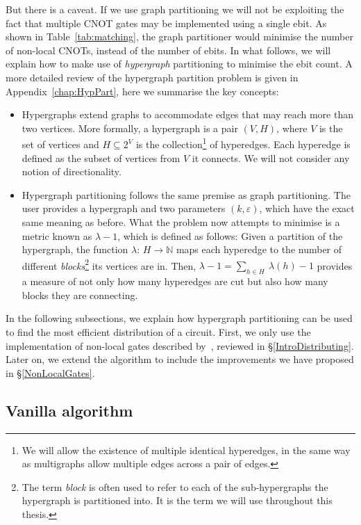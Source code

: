 But there is a caveat. If we use graph partitioning we will not be exploiting the fact that multiple CNOT gates may be implemented using a single ebit. As shown in Table~\ref{tab:matching}, the graph partitioner would minimise the number of non-local CNOTs, instead of the number of ebits. In what follows, we will explain how to make use of \textit{hypergraph} partitioning to minimise the ebit count. A more detailed review of the hypergraph partition problem is given in Appendix~\ref{chap:HypPart}, here we summarise the key concepts:

\begin{itemize}
  \item Hypergraphs extend graphs to accommodate edges that may reach more than two vertices. More formally, a hypergraph is a pair \((V,H)\), where \(V\) is the set of vertices and \(H \subseteq 2^V\) is the collection\footnote{We will allow the existence of multiple identical hyperedges, in the same way as multigraphs allow multiple edges across a pair of edges.} of hyperedges. Each hyperedge is defined as the subset of vertices from \(V\) it connects. We will not consider any notion of directionality.
  \item Hypergraph partitioning follows the same premise as graph partitioning. The user provides a hypergraph and two parameters \((k,\varepsilon)\), which have the exact same meaning as before. What the problem now attempts to minimise is a metric known as \(\lambda\!-\!1\), which is defined as follows: Given a partition of the hypergraph, the function \(\lambda\colon\, H \to \mathbb{N}\) maps each hyperedge to the number of different \textit{blocks}\footnote{The term \textit{block} is often used to refer to each of the sub-hypergraphs the hypergraph is partitioned into. It is the term we will use throughout this thesis.} its vertices are in. Then, \(\lambda\!-\!1 = \sum_{h \in H} \ \lambda(h)\!-\! 1\) provides a measure of not only how many hyperedges are cut but also how many blocks they are connecting.
\end{itemize}

In the following subsections, we explain how hypergraph partitioning can be used to find the most efficient distribution of a circuit. First, we only use the implementation of non-local gates described by~\citet{NonLocalCNOT}, reviewed in \S\ref{IntroDistributing}. Later on, we extend the algorithm to include the improvements we have proposed in \S\ref{NonLocalGates}.

\subsection{Vanilla algorithm}
\label{Vanilla}

